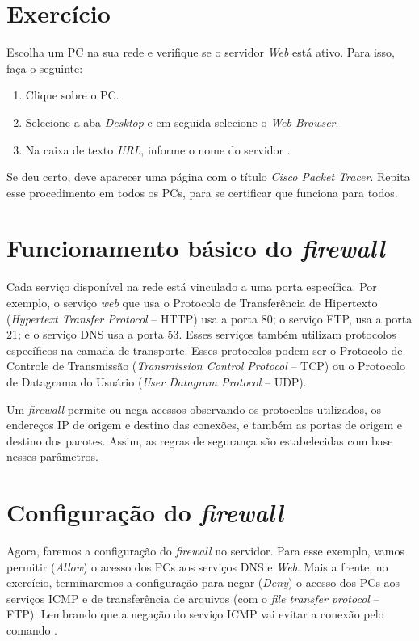 \section{Exercício}
Escolha um PC na sua rede e verifique se o servidor \textit{Web} está ativo. Para isso, faça o seguinte:

\begin{enumerate}[label*=\arabic*.]
\item Clique sobre o PC.
\item Selecione a aba \textit{Desktop} e em seguida selecione o \textit{Web Browser}.
\item Na caixa de texto \textit{URL}, informe o nome do servidor .
\end{enumerate}

Se deu certo, deve aparecer uma página com o título \textit{Cisco Packet Tracer}. Repita esse procedimento em todos os PCs, para se certificar que funciona para todos.

\section{Funcionamento básico do \textit{firewall}}\label{sec:funcBasicoFirewall}

Cada serviço disponível na rede está vinculado a uma porta específica. Por exemplo, o serviço \textit{web} que usa o  Protocolo de Transferência de Hipertexto (\textit{Hypertext Transfer Protocol} -- HTTP) usa a porta 80; o serviço FTP, usa a porta 21; e o serviço DNS usa a porta 53. Esses serviços também utilizam protocolos específicos na camada de transporte. Esses protocolos podem ser o Protocolo de Controle de Transmissão (\textit{Transmission Control Protocol} -- TCP) ou o Protocolo de Datagrama do Usuário (\textit{User Datagram Protocol} -- UDP).

Um \textit{firewall} permite ou nega acessos observando os protocolos utilizados, os endereços IP de origem e destino das conexões, e também as portas de origem e destino dos pacotes. Assim, as regras de segurança são estabelecidas com base nesses parâmetros.

\section{Configuração do \textit{firewall}}\label{sec:configFirewall}
Agora, faremos a configuração do \textit{firewall} no servidor. Para esse exemplo, vamos permitir (\textit{Allow}) o acesso dos PCs aos serviços DNS e \textit{Web}. Mais a frente, no exercício, terminaremos a configuração para negar (\textit{Deny}) o acesso dos PCs aos serviços ICMP e de transferência de arquivos (com o \textit{file transfer protocol} -- FTP). Lembrando que a negação do serviço ICMP vai evitar a conexão pelo comando .

